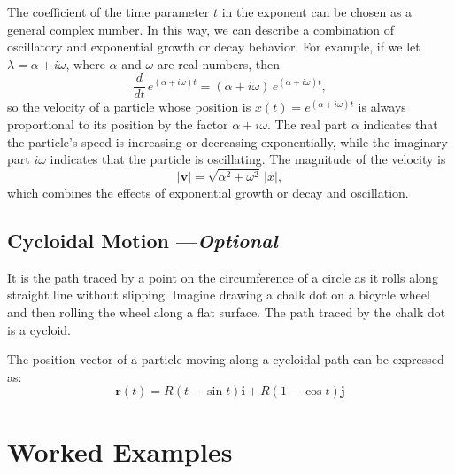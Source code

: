 \documentclass[../main.tex]{subfiles}
\theoremstyle{remark}
\begin{document}
The coefficient of the time parameter $t$ in the exponent can be chosen as a general complex number. In this way, we can describe a combination of oscillatory and exponential growth or decay behavior. For example, if we let $\lambda = \alpha + i\omega$, where $\alpha$ and $\omega$ are real numbers, then
\begin{equation}
    \frac{d}{dt}\,e^{(\alpha+i\omega) t}
      = (\alpha+i\omega)\,e^{(\alpha+i\omega) t},
\end{equation}
so the velocity of a particle whose position is $x(t)=e^{(\alpha+i\omega) t}$ is always proportional to its position by the factor $\alpha+i\omega$. The real part $\alpha$ indicates that the particle's speed is increasing or decreasing exponentially, while the imaginary part $i\omega$ indicates that the particle is oscillating. The magnitude of the velocity is
\begin{equation}
    |\mathbf{v}| = \sqrt{\alpha^2+\omega^2}\,|x|,
\end{equation}
which combines the effects of exponential growth or decay and oscillation.














\subsection{Cycloidal Motion ---\textit{Optional}}
It is the path traced by a point on the circumference of a circle as it rolls along straight line without slipping. Imagine drawing a chalk dot on a bicycle wheel and then rolling the wheel along a flat surface. The path traced by the chalk dot is a cycloid. 

The position vector of a particle moving along a cycloidal path can be expressed as:
\[
\mathbf{r}(t) = R(t - \sin t)\mathbf{i} + R(1 - \cos t)\mathbf{j}
\]







\section{Worked Examples}
\end{document}
